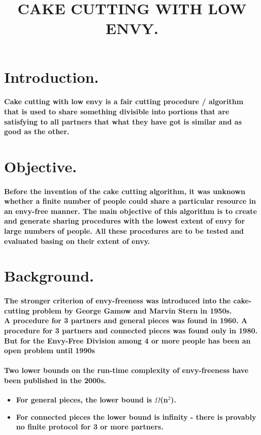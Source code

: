 \documentclass[12pt]{report}
\title{\textbf{CAKE CUTTING WITH LOW ENVY.}}
\author{}
\begin{document}
\maketitle

	\section{Introduction.} 
	\paragraph{Cake cutting with low envy is a fair cutting procedure / algorithm that is used to share something divisible into portions that are satisfying to all partners that what they have got is similar and as good as the other. }
	
		\section{Objective.}
		\paragraph{Before the invention of the cake cutting algorithm, it was unknown whether a finite number of people could share a particular resource in an envy-free manner. The main objective of this algorithm is to create and generate sharing procedures with the lowest extent of envy for large numbers of people. All these procedures are to be tested and evaluated basing on their extent of envy.  }
		
	\section{Background.}
	\paragraph{The stronger criterion of envy-freeness was introduced into the cake-cutting problem by George Gamow and Marvin Stern in 1950s.\\
		A procedure for 3 partners and general pieces was found in 1960. A procedure for 3 partners and connected pieces was found only in 1980.\\
		But for the Envy-Free Division among 4 or more people has been an open problem until 1990s}
	\paragraph{Two lower bounds on the run-time complexity of envy-freeness have been published in the 2000s.}
	\begin{itemize}
		\item \textbf{For general pieces, the lower bound is $\Omega$(n$^{2}$).}
		\item \textbf{For connected pieces the lower bound is infinity - there is provably no finite protocol for 3 or more partners.}
	\end{itemize}
\end{document}
